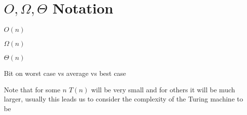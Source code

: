 \section{$O, \Omega, \Theta$ Notation}

\begin{definition}
	$O(n)$
\end{definition}

\begin{definition}
	$\Omega(n)$
\end{definition}

\begin{definition}
	$\Theta(n)$
\end{definition}
Bit on worst case vs average vs best case

Note that for some $n$ $T(n)$ will be very small and for others it will be much larger,
usually this leads us to consider the complexity of the Turing machine to be 
